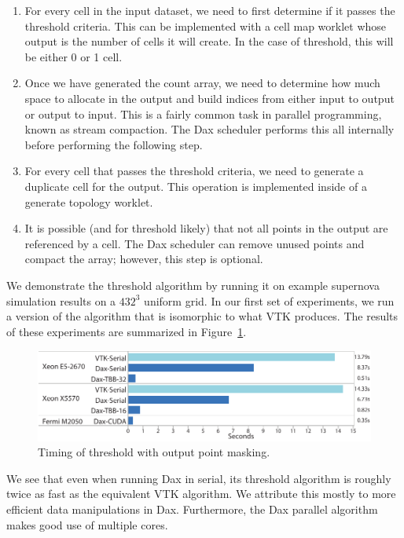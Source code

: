 \begin{enumerate}
\item For every cell in the input dataset, we need to first determine if it
  passes the threshold criteria. This can be implemented with a cell map
  worklet whose output is the number of cells it will create. In the case
  of threshold, this will be either 0 or 1 cell.
\item Once we have generated the count array, we need to determine how much
  space to allocate in the output and build indices from either input to
  output or output to input. This is a fairly common task in parallel
  programming, known as stream compaction. The Dax scheduler performs this
  all internally before performing the following step.
\item For every cell that passes the threshold criteria, we need to
  generate a duplicate cell for the output. This operation is implemented
  inside of a generate topology worklet.
\item It is possible (and for threshold likely) that not all points in the
  output are referenced by a cell. The Dax scheduler can remove unused
  points and compact the array; however, this step is optional.
\end{enumerate}

We demonstrate the threshold algorithm by running it on example supernova
simulation results on a $432^3$ uniform grid. In our first set of
experiments, we run a version of the algorithm that is isomorphic to what
VTK produces. The results of these experiments are summarized in
Figure~\ref{fig:TimingThresholdPointMask}.

\begin{figure}[htb]
  \centering
  \includegraphics{images/TimingThresholdPointMask}
  \caption{Timing of threshold with output point masking.}
  \label{fig:TimingThresholdPointMask}
\end{figure}

We see that even when running Dax in serial, its threshold algorithm is
roughly twice as fast as the equivalent VTK algorithm. We attribute this
mostly to more efficient data manipulations in Dax. Furthermore, the Dax
parallel algorithm makes good use of multiple cores.

